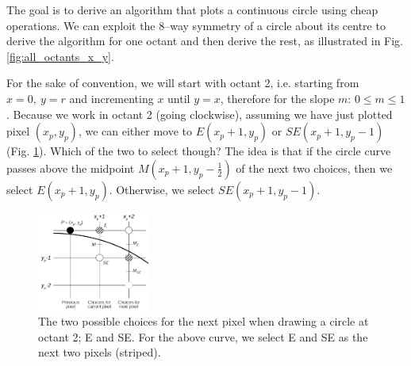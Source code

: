 \documentclass[a4paper]{article}
\begin{document}
The goal is to derive an algorithm that plots a continuous circle using cheap operations. We can exploit the 8--way symmetry of a circle about its centre to derive the algorithm for one octant and then derive the rest, as illustrated in Fig. \ref{fig:all_octants_x_y}. 

For the sake of convention, we will start with octant 2, i.e. starting from $x=0,\ y=r$ and incrementing $x$ until $y=x$, therefore for the slope $m$: $0 \leq m \leq 1$. Because we work in octant 2 (going clockwise), assuming we have just plotted pixel $(x_p,y_p)$, we can either move to $E(x_p+1, y_p)$ or $SE(x_p+1, y_p-1)$ (Fig. \ref{fig:bres_algo_next_pixel}). Which of the two to select though? The idea is that if the circle curve passes above the midpoint $M(x_p+1, y_p-\tfrac{1}{2})$ of the next two choices, then we select $E(x_p+1, y_p)$. Otherwise, we select $SE(x_p+1, y_p-1)$.

\begin{figure}[H]
    \centering
    \includegraphics[height=3.25cm]{img/bres_algo_next_pixel.png}
    \caption{The two possible choices for the next pixel when drawing a circle at octant 2; E and SE. For the above curve, we select E and SE as the next two pixels (striped).}
    \label{fig:bres_algo_next_pixel}
\end{figure}
\end{document}
